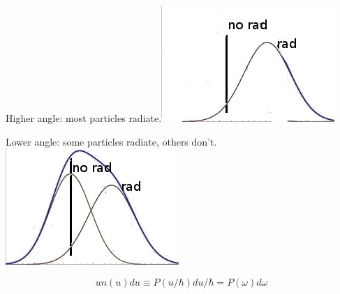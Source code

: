\documentclass{beamer}
\begin{document}
\begin{frame}
Higher angle: most particles radiate.\includegraphics[scale=0.3]{gauss2.jpg} \par
Lower angle: some particles radiate, others don't.
\includegraphics[scale=0.3]{gauss2a.jpg} 
\par

\begin{equation}
un(u) du \equiv P(u/\hbar)du/\hbar =  P(\omega)d\omega
\end{equation}

\end{frame}
\end{document}
